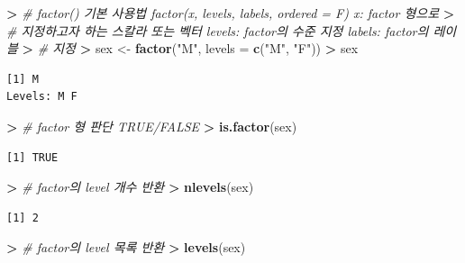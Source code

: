 \documentclass[11pt,a4paper]{book}
\newenvironment{Shaded}{\begin{snugshade}}{\end{snugshade}}
\newcommand{\KeywordTok}[1]{\textcolor[rgb]{0.13,0.29,0.53}{\textbf{#1}}}
\newcommand{\DataTypeTok}[1]{\textcolor[rgb]{0.13,0.29,0.53}{#1}}
\newcommand{\StringTok}[1]{\textcolor[rgb]{0.31,0.60,0.02}{#1}}
\newcommand{\CommentTok}[1]{\textcolor[rgb]{0.56,0.35,0.01}{\textit{#1}}}
\newcommand{\OperatorTok}[1]{\textcolor[rgb]{0.81,0.36,0.00}{\textbf{#1}}}
\newcommand{\ErrorTok}[1]{\textcolor[rgb]{0.64,0.00,0.00}{\textbf{#1}}}
\newcommand{\NormalTok}[1]{#1}
\theoremstyle{definition}
\theoremstyle{definition}
\theoremstyle{definition}
\theoremstyle{remark}
\begin{document}
\vspace{0.5cm}

\footnotesize

\begin{Shaded}
\begin{Highlighting}[]
\OperatorTok{>}\StringTok{ }\CommentTok{# factor() 기본 사용법 factor(x, levels, labels, ordered = F) x: factor 형으로}
\ErrorTok{>}\StringTok{ }\CommentTok{# 지정하고자 하는 스칼라 또는 벡터 levels: factor의 수준 지정 labels: factor의 레이블}
\ErrorTok{>}\StringTok{ }\CommentTok{# 지정}
\ErrorTok{>}\StringTok{ }\NormalTok{sex <-}\StringTok{ }\KeywordTok{factor}\NormalTok{(}\StringTok{"M"}\NormalTok{, }\DataTypeTok{levels =} \KeywordTok{c}\NormalTok{(}\StringTok{"M"}\NormalTok{, }\StringTok{"F"}\NormalTok{))}
\OperatorTok{>}\StringTok{ }\NormalTok{sex}
\end{Highlighting}
\end{Shaded}

\begin{verbatim}
[1] M
Levels: M F
\end{verbatim}

\begin{Shaded}
\begin{Highlighting}[]
\OperatorTok{>}\StringTok{ }\CommentTok{# factor 형 판단 TRUE/FALSE}
\ErrorTok{>}\StringTok{ }\KeywordTok{is.factor}\NormalTok{(sex)}
\end{Highlighting}
\end{Shaded}

\begin{verbatim}
[1] TRUE
\end{verbatim}

\begin{Shaded}
\begin{Highlighting}[]
\OperatorTok{>}\StringTok{ }\CommentTok{# factor의 level 개수 반환}
\ErrorTok{>}\StringTok{ }\KeywordTok{nlevels}\NormalTok{(sex)}
\end{Highlighting}
\end{Shaded}

\begin{verbatim}
[1] 2
\end{verbatim}

\begin{Shaded}
\begin{Highlighting}[]
\OperatorTok{>}\StringTok{ }\CommentTok{# factor의 level 목록 반환}
\ErrorTok{>}\StringTok{ }\KeywordTok{levels}\NormalTok{(sex)}
\end{Highlighting}
\end{Shaded}
\end{document}
